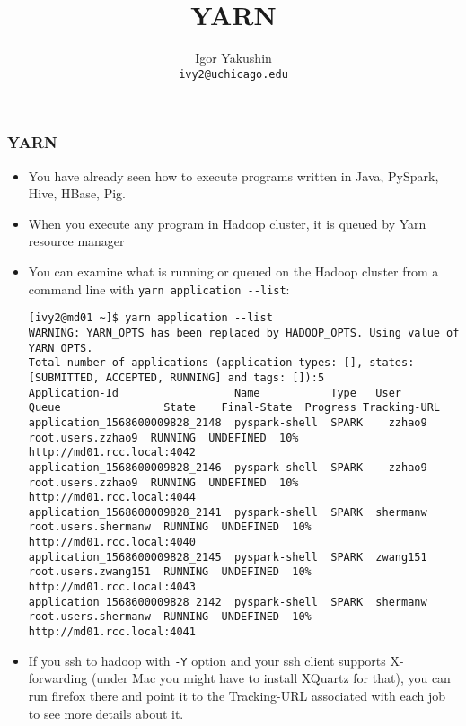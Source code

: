 \documentclass{beamer}
\title{\huge{YARN}}
\author{Igor Yakushin \\ \texttt{ivy2@uchicago.edu}}
\begin{document}



\begin{frame}
\titlepage
\end{frame}


\begin{frame}[fragile]
  \frametitle{YARN}
  \begin{itemize}
  \item You have already seen how to execute programs written in Java, PySpark, Hive, HBase, Pig.
  \item When you execute any program in Hadoop cluster, it is queued by Yarn resource manager
  \item You can examine what is running or queued on the Hadoop cluster from a command line
    with {\color{mycolorcli}\verb|yarn application --list|}:
    {\fontsize{4}{6}

      {\color{mycolorcli}
\begin{verbatim}
[ivy2@md01 ~]$ yarn application --list
WARNING: YARN_OPTS has been replaced by HADOOP_OPTS. Using value of YARN_OPTS.
Total number of applications (application-types: [], states: [SUBMITTED, ACCEPTED, RUNNING] and tags: []):5
Application-Id                  Name           Type   User       Queue                State    Final-State  Progress Tracking-URL
application_1568600009828_2148  pyspark-shell  SPARK    zzhao9     root.users.zzhao9  RUNNING  UNDEFINED  10%  http://md01.rcc.local:4042
application_1568600009828_2146  pyspark-shell  SPARK    zzhao9     root.users.zzhao9  RUNNING  UNDEFINED  10%  http://md01.rcc.local:4044
application_1568600009828_2141  pyspark-shell  SPARK  shermanw   root.users.shermanw  RUNNING  UNDEFINED  10%  http://md01.rcc.local:4040
application_1568600009828_2145  pyspark-shell  SPARK  zwang151   root.users.zwang151  RUNNING  UNDEFINED  10%  http://md01.rcc.local:4043
application_1568600009828_2142  pyspark-shell  SPARK  shermanw   root.users.shermanw  RUNNING  UNDEFINED  10%  http://md01.rcc.local:4041
\end{verbatim}
      }
    }
  \item If you ssh to hadoop with \verb|-Y| option and your ssh client supports X-forwarding
    (under Mac you might have to install XQuartz for that),
    you can run firefox there and point it to the Tracking-URL associated with each job to see more details
    about it.
  \end{itemize}
\end{frame}
\end{document}
